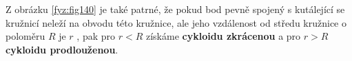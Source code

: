 \begin{mdframed}[style=mdexam]
\begin{example}
    Z obrázku \ref{fyz:fig140} je také patrné, že pokud bod pevně spojený s kutálející se kružnicí 
    neleží na obvodu této kružnice, ale jeho vzdálenost od středu kružnice o poloměru \(R\)  je 
    \(r\) , pak pro \(r<R\) získáme \textbf{cykloidu zkrácenou} a pro \(r>R\)  \textbf{cykloidu 
    prodlouženou}.
      
    

  \end{example}
\end{mdframed}